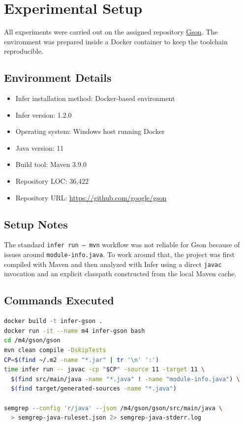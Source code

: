 \documentclass[11pt]{article}
\begin{document}
\section{Experimental Setup}
All experiments were carried out on the assigned repository \href{https://github.com/google/gson}{Gson}. The environment was prepared inside a Docker container to keep the toolchain reproducible. 

\subsection{Environment Details}
\begin{itemize}
\item Infer installation method: Docker-based environment
\item Infer version: 1.2.0
\item Operating system: Windows host running Docker
\item Java version: 11
\item Build tool: Maven 3.9.0
\item Repository LOC: 36,422
\item Repository URL: \url{https://github.com/google/gson}
\end{itemize}

\subsection{Setup Notes}
The standard \texttt{infer run -- mvn} workflow was not reliable for Gson because of issues around \texttt{module-info.java}. To work around that, the project was first compiled with Maven and then analyzed with Infer using a direct \texttt{javac} invocation and an explicit classpath constructed from the local Maven cache.

\subsection{Commands Executed}
\begin{lstlisting}[language=bash]
docker build -t infer-gson .
docker run -it --name m4 infer-gson bash
cd /m4/gson/gson
mvn clean compile -DskipTests
CP=$(find ~/.m2 -name "*.jar" | tr '\n' ':')
time infer run -- javac -cp "$CP" -source 11 -target 11 \
  $(find src/main/java -name "*.java" ! -name "module-info.java") \
  $(find target/generated-sources -name "*.java")

semgrep --config 'r/java' --json /m4/gson/gson/src/main/java \
  > semgrep-java-ruleset.json 2> semgrep-java-stderr.log
\end{lstlisting}
\end{document}
